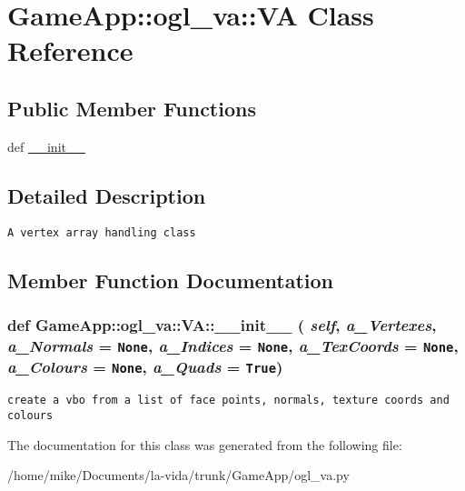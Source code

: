 \hypertarget{classGameApp_1_1ogl__va_1_1VA}{
\section{GameApp::ogl\_\-va::VA Class Reference}
\label{classGameApp_1_1ogl__va_1_1VA}
}
\subsection*{Public Member Functions}
\begin{CompactItemize}
\item 
def \hyperlink{classGameApp_1_1ogl__va_1_1VA_3a95acf2cb9a0a475b4cdbc4843feca6}{\_\-\_\-init\_\-\_\-}
\end{CompactItemize}


\subsection{Detailed Description}


\footnotesize\begin{verbatim}A vertex array handling class\end{verbatim}
\normalsize
 

\subsection{Member Function Documentation}
\hypertarget{classGameApp_1_1ogl__va_1_1VA_3a95acf2cb9a0a475b4cdbc4843feca6}{
\subsubsection[\_\-\_\-init\_\-\_\-]{\setlength{\rightskip}{0pt plus 5cm}def GameApp::ogl\_\-va::VA::\_\-\_\-init\_\-\_\- ( {\em self}, \/   {\em a\_\-Vertexes}, \/   {\em a\_\-Normals} = {\tt None}, \/   {\em a\_\-Indices} = {\tt None}, \/   {\em a\_\-TexCoords} = {\tt None}, \/   {\em a\_\-Colours} = {\tt None}, \/   {\em a\_\-Quads} = {\tt True})}}
\label{classGameApp_1_1ogl__va_1_1VA_3a95acf2cb9a0a475b4cdbc4843feca6}




\footnotesize\begin{verbatim}
create a vbo from a list of face points, normals, texture coords and colours
\end{verbatim}
\normalsize
 

The documentation for this class was generated from the following file:\begin{CompactItemize}
\item 
/home/mike/Documents/la-vida/trunk/GameApp/ogl\_\-va.py\end{CompactItemize}
